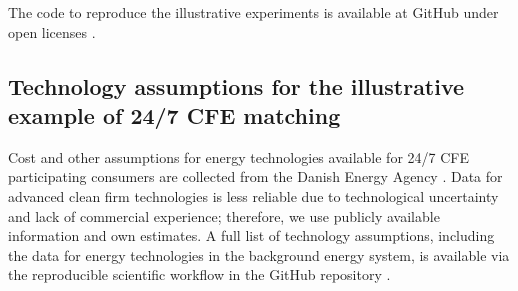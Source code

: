 \documentclass[pdflatex,sn-basic, Numbered]{sn-jnl}
\theoremstyle{thmstyleone}%
\theoremstyle{thmstyletwo}%
\theoremstyle{thmstylethree}%
\begin{document}
 The code to reproduce the illustrative experiments is available at GitHub under open licenses \cite{code247CFE}.


\FloatBarrier
\newpage

\subsection*{Technology assumptions for the illustrative example of 24/7 CFE matching}
\label{sec:annex}

Cost and other assumptions for energy technologies available for 24/7 CFE participating consumers are collected from the Danish Energy Agency \cite{DEA-technologydata}.
Data for advanced clean firm technologies is less reliable due to technological uncertainty and lack of commercial experience; therefore, we use publicly available information and own estimates.
A full list of technology assumptions, including the data for energy technologies in the background energy system, is available via the reproducible scientific workflow in the GitHub repository \cite{code247CFE}.
\end{document}

